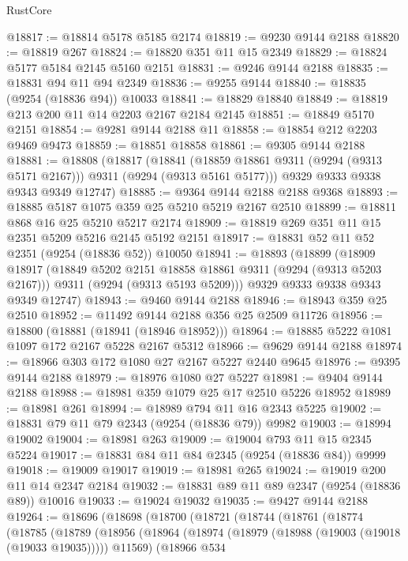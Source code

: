 \begin{lexlean}{RustCore}
\begin{coremodule}
@18817 := @18814 @5178 @5185 @2174
@18819 := @9230 @9144 @2188
@18820 := @18819 @267
@18824 := @18820 @351 @11 @15 @2349
@18829 := @18824 @5177 @5184 @2145 @5160 @2151
@18831 := @9246 @9144 @2188
@18835 := @18831 @94 @11 @94 @2349
@18836 := @9255 @9144
@18840 := @18835 (@9254 (@18836 @94)) @10033
@18841 := @18829 @18840
@18849 := @18819 @213 @200 @11 @14 @2203 @2167 @2184 @2145
@18851 := @18849 @5170 @2151
@18854 := @9281 @9144 @2188 @11
@18858 := @18854 @212 @2203 @9469 @9473
@18859 := @18851 @18858
@18861 := @9305 @9144 @2188
@18881 := @18808
    (@18817
      (@18841 (@18859 @18861 @9311 (@9294 (@9313 @5171 @2167))) @9311 (@9294 (@9313 @5161 @5177)))
      @9329
      @9333
      @9338
      @9343
      @9349
      @12747)
@18885 := @9364 @9144 @2188 @2188 @9368
@18893 := @18885 @5187 @1075 @359 @25 @5210 @5219 @2167 @2510
@18899 := @18811 @868 @16 @25 @5210 @5217 @2174
@18909 := @18819 @269 @351 @11 @15 @2351 @5209 @5216 @2145 @5192 @2151
@18917 := @18831 @52 @11 @52 @2351 (@9254 (@18836 @52)) @10050
@18941 := @18893
    (@18899
      (@18909
        @18917
        (@18849 @5202 @2151 @18858 @18861 @9311 (@9294 (@9313 @5203 @2167)))
        @9311
        (@9294 (@9313 @5193 @5209)))
      @9329
      @9333
      @9338
      @9343
      @9349
      @12747)
@18943 := @9460 @9144 @2188
@18946 := @18943 @359 @25 @2510
@18952 := @11492 @9144 @2188 @356 @25 @2509 @11726
@18956 := @18800 (@18881 (@18941 (@18946 @18952)))
@18964 := @18885 @5222 @1081 @1097 @172 @2167 @5228 @2167 @5312
@18966 := @9629 @9144 @2188
@18974 := @18966 @303 @172 @1080 @27 @2167 @5227 @2440 @9645
@18976 := @9395 @9144 @2188
@18979 := @18976 @1080 @27 @5227
@18981 := @9404 @9144 @2188
@18988 := @18981 @359 @1079 @25 @17 @2510 @5226 @18952
@18989 := @18981 @261
@18994 := @18989 @794 @11 @16 @2343 @5225
@19002 := @18831 @79 @11 @79 @2343 (@9254 (@18836 @79)) @9982
@19003 := @18994 @19002
@19004 := @18981 @263
@19009 := @19004 @793 @11 @15 @2345 @5224
@19017 := @18831 @84 @11 @84 @2345 (@9254 (@18836 @84)) @9999
@19018 := @19009 @19017
@19019 := @18981 @265
@19024 := @19019 @200 @11 @14 @2347 @2184
@19032 := @18831 @89 @11 @89 @2347 (@9254 (@18836 @89)) @10016
@19033 := @19024 @19032
@19035 := @9427 @9144 @2188
@19264 := @18696
    (@18698
      (@18700
        (@18721
          (@18744
            (@18761
              (@18774
                (@18785
                  (@18789
                    (@18956
                      (@18964
                        (@18974 (@18979 (@18988 (@19003 (@19018 (@19033 @19035))))) @11569)
                        (@18966
                          @534

\end{coremodule}
\end{lexlean}

